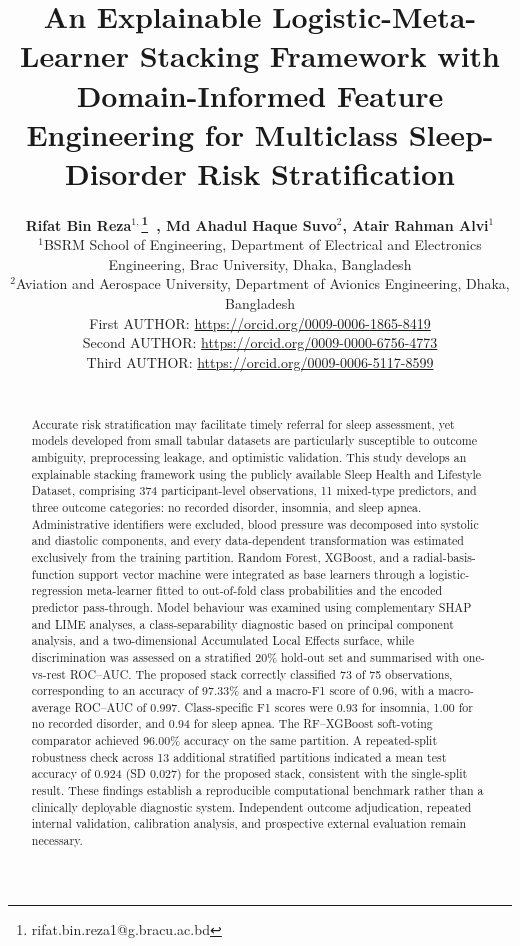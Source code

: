 \documentclass{elektr}
\title{An Explainable Logistic-Meta-Learner Stacking Framework with Domain-Informed Feature Engineering for Multiclass Sleep-Disorder Risk Stratification}
\author[AUTHOR and AUTHOR]{
	\textbf{Rifat Bin Reza$^{1,}$\thanks{rifat.bin.reza1@g.bracu.ac.bd}~, Md Ahadul Haque Suvo$^{2}$, Atair Rahman Alvi$^{1}$}\\
	$^{1}$BSRM School of Engineering, Department of Electrical and Electronics Engineering, Brac University, Dhaka, Bangladesh\\ 	
	$^{2}$Aviation and Aerospace University, Department of Avionics Engineering, Dhaka, Bangladesh\\
  First AUTHOR: \url{https://orcid.org/0009-0006-1865-8419} \\
  Second AUTHOR: \url{https://orcid.org/0009-0000-6756-4773} \\
  Third AUTHOR: \url{https://orcid.org/0009-0006-5117-8599} \\
  \\ 
\rec{...}
\acc{...}
\finv{...}
}
\begin{document}
\raggedbottom
\setlength{\textfloatsep}{7pt plus 2pt minus 2pt}
\setlength{\floatsep}{6pt plus 2pt minus 2pt}
\setlength{\intextsep}{6pt plus 2pt minus 2pt}
\setlength{\abovedisplayskip}{5pt plus 2pt minus 2pt}
\setlength{\belowdisplayskip}{5pt plus 2pt minus 2pt}
\setlength{\abovedisplayshortskip}{3pt plus 1pt minus 1pt}
\setlength{\belowdisplayshortskip}{3pt plus 1pt minus 1pt}
\renewcommand{\arraystretch}{0.93}

\maketitle

\begin{abstract}Accurate risk stratification may facilitate timely referral for sleep assessment, yet models developed from small tabular datasets are particularly susceptible to outcome ambiguity, preprocessing leakage, and optimistic validation. This study develops an explainable stacking framework using the publicly available Sleep Health and Lifestyle Dataset, comprising 374 participant-level observations, 11 mixed-type predictors, and three outcome categories: no recorded disorder, insomnia, and sleep apnea. Administrative identifiers were excluded, blood pressure was decomposed into systolic and diastolic components, and every data-dependent transformation was estimated exclusively from the training partition. Random Forest, XGBoost, and a radial-basis-function support vector machine were integrated as base learners through a logistic-regression meta-learner fitted to out-of-fold class probabilities and the encoded predictor pass-through. Model behaviour was examined using complementary SHAP and LIME analyses, a class-separability diagnostic based on principal component analysis, and a two-dimensional Accumulated Local Effects surface, while discrimination was assessed on a stratified 20\% hold-out set and summarised with one-vs-rest ROC--AUC. The proposed stack correctly classified 73 of 75 observations, corresponding to an accuracy of 97.33\% and a macro-F1 score of 0.96, with a macro-average ROC--AUC of 0.997. Class-specific F1 scores were 0.93 for insomnia, 1.00 for no recorded disorder, and 0.94 for sleep apnea. The RF--XGBoost soft-voting comparator achieved 96.00\% accuracy on the same partition. A repeated-split robustness check across 13 additional stratified partitions indicated a mean test accuracy of 0.924 (SD 0.027) for the proposed stack, consistent with the single-split result. These findings establish a reproducible computational benchmark rather than a clinically deployable diagnostic system. Independent outcome adjudication, repeated internal validation, calibration analysis, and prospective external evaluation remain necessary.

\end{abstract}
\end{document}
